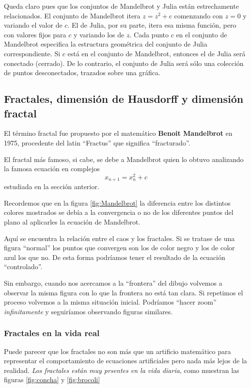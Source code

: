 Queda claro pues que los conjuntos de Mandelbrot y Julia están estrechamente relacionados. El conjunto de Mandelbrot itera $z=z^2+c$ comenzando con $z = 0$ y variando el valor de $c$. El de Julia, por su parte, itera esa misma función, pero con valores fijos para $c$ y variando los de $z$. Cada punto $c$ en el conjunto de Mandelbrot especifica la estructura geométrica del conjunto de Julia correspondiente. Si $c$ está en el conjunto de Mandelbrot, entonces el de Julia será conectado (cerrado). De lo contrario, el conjunto de Julia será sólo una colección de puntos desconectados, trazados sobre una gráfica.

\subsection{Fractales, dimensión de Hausdorff y dimensión fractal}

El término fractal fue propuesto por el matemático \textbf{Benoit Mandelbrot} en 1975, procedente del latin ``Fractus'' que significa ``fracturado''.

El fractal más famoso, si cabe, se debe a Mandelbrot quien lo obtuvo analizando la famosa ecuación en complejos
\[x_{n+1} = x_n^2 + c\]
estudiada en la sección anterior.

Recordemos que en la figura \ref{fig:Mandelbrot} la diferencia entre los distintos colores mostrados se debía a la convergencia o no de los diferentes puntos del plano al aplicarles la ecuación de Mandelbrot.

Aquí se encuentra la relación entre el caos y los fractales. Si se tratase de una figura ``normal'' los puntos que convergen son los de color negro y los de color azul los que no. De esta forma podríamos tener el resultado de la ecuación ``controlado''.

Sin embargo, cuando nos acercamos a la ``frontera'' del dibujo volvemos a observar la misma figura con lo que la frontera no está tan clara. Si repetimos el proceso volvemos a la misma situación inicial. Podríamos ``hacer zoom'' \emph{infinitamente} y seguiríamos observando figuras similares.

\subsubsection{Fractales en la vida real}
Puede parecer que los fractales no son más que un artificio matemático para representar el comportamiento de ecuaciones artificiales pero nada más lejos de la realidad. \emph{Los fractales están muy prsentes en la vida diaria}, como muestran las figuras \ref{fig:concha} y \ref{fig:brocoli}

